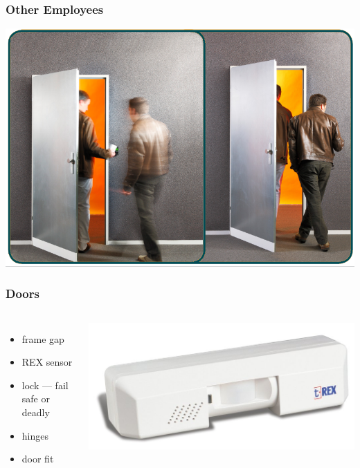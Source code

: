 \documentclass[]{beamer}
\begin{document}
\begin{frame}
\end{frame}



\begin{frame}
  \frametitle{Other Employees}
  \includegraphics[width=.9\textwidth]{tailgating}
\end{frame}

\begin{frame}
  \frametitle{Doors}
  \begin{columns}[c]
  \begin{itemize}
    \item frame gap
    \item REX sensor
    \item lock --- fail safe or deadly
    \item hinges
    \item door fit
  \end{itemize}
  \includegraphics{T-REX}
\end{columns}
\end{frame}
\end{document}
